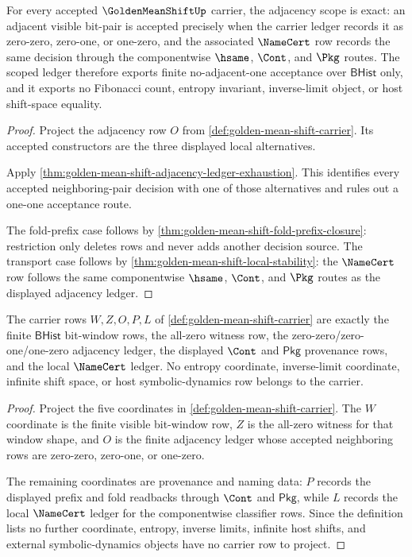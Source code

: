 \begin{theorem}
\label{thm:golden-mean-shift-adjacency-scope-exactness}
For every accepted $\GoldenMeanShiftUp$ carrier, the adjacency scope is exact: an adjacent visible bit-pair is accepted precisely when the carrier ledger records it as zero-zero, zero-one, or one-zero, and the associated $\NameCert$ row records the same decision through the componentwise $\hsame$, $\Cont$, and $\Pkg$ routes. The scoped ledger therefore exports finite no-adjacent-one acceptance over $\mathsf{BHist}$ only, and it exports no Fibonacci count, entropy invariant, inverse-limit object, or host shift-space equality.
\end{theorem}
\begin{proof}
Project the adjacency row $O$ from \autoref{def:golden-mean-shift-carrier}. Its accepted constructors are the three displayed local alternatives.

Apply \autoref{thm:golden-mean-shift-adjacency-ledger-exhaustion}. This identifies every accepted neighboring-pair decision with one of those alternatives and rules out a one-one acceptance route.

The fold-prefix case follows by \autoref{thm:golden-mean-shift-fold-prefix-closure}: restriction only deletes rows and never adds another decision source. The transport case follows by \autoref{thm:golden-mean-shift-local-stability}: the $\NameCert$ row follows the same componentwise $\hsame$, $\Cont$, and $\Pkg$ routes as the displayed adjacency ledger.
\end{proof}

\begin{theorem}
\label{thm:golden-mean-shift-carrier-row-scope}
The carrier rows $W,Z,O,P,L$ of \autoref{def:golden-mean-shift-carrier} are exactly the finite $\mathsf{BHist}$ bit-window rows, the all-zero witness row, the zero-zero/zero-one/one-zero adjacency ledger, the displayed $\Cont$ and $\mathsf{Pkg}$ provenance rows, and the local $\NameCert$ ledger. No entropy coordinate, inverse-limit coordinate, infinite shift space, or host symbolic-dynamics row belongs to the carrier.
\end{theorem}
\begin{proof}
Project the five coordinates in \autoref{def:golden-mean-shift-carrier}. The $W$ coordinate is the finite visible bit-window row, $Z$ is the all-zero witness for that window shape, and $O$ is the finite adjacency ledger whose accepted neighboring rows are zero-zero, zero-one, or one-zero.

The remaining coordinates are provenance and naming data: $P$ records the displayed prefix and fold readbacks through $\Cont$ and $\mathsf{Pkg}$, while $L$ records the local $\NameCert$ ledger for the componentwise classifier rows. Since the definition lists no further coordinate, entropy, inverse limits, infinite host shifts, and external symbolic-dynamics objects have no carrier row to project.
\end{proof}

